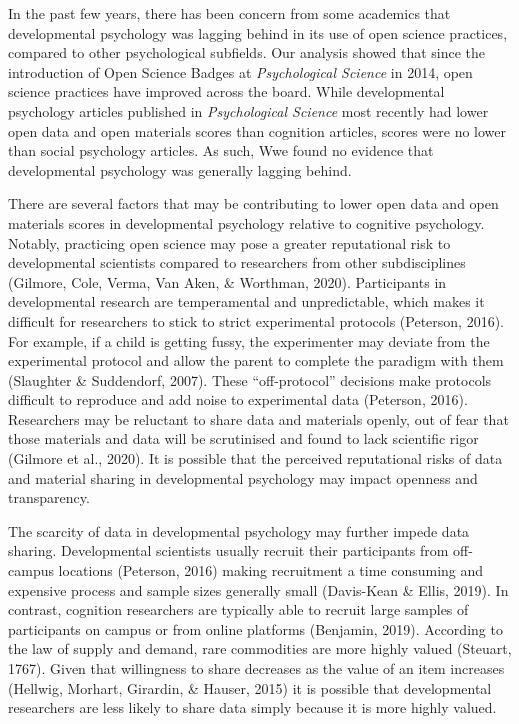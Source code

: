 \documentclass[
  english,
  man,floatsintext]{apa6}
\begin{document}
In the past few years, there has been concern from some academics that developmental psychology was lagging behind in its use of open science practices, compared to other psychological subfields. Our analysis showed that since the introduction of Open Science Badges at \emph{Psychological Science} in 2014, open science practices have improved across the board. While developmental psychology articles published in \emph{Psychological Science} most recently had lower open data and open materials scores than cognition articles, scores were no lower than social psychology articles. As such, Wwe found no evidence that developmental psychology was generally lagging behind.

There are several factors that may be contributing to lower open data and open materials scores in developmental psychology relative to cognitive psychology. Notably, practicing open science may pose a greater reputational risk to developmental scientists compared to researchers from other subdisciplines (Gilmore, Cole, Verma, Van Aken, \& Worthman, 2020). Participants in developmental research are temperamental and unpredictable, which makes it difficult for researchers to stick to strict experimental protocols (Peterson, 2016). For example, if a child is getting fussy, the experimenter may deviate from the experimental protocol and allow the parent to complete the paradigm with them (Slaughter \& Suddendorf, 2007). These ``off-protocol'' decisions make protocols difficult to reproduce and add noise to experimental data (Peterson, 2016). Researchers may be reluctant to share data and materials openly, out of fear that those materials and data will be scrutinised and found to lack scientific rigor (Gilmore et al., 2020). It is possible that the perceived reputational risks of data and material sharing in developmental psychology may impact openness and transparency.

The scarcity of data in developmental psychology may further impede data sharing. Developmental scientists usually recruit their participants from off-campus locations (Peterson, 2016) making recruitment a time consuming and expensive process and sample sizes generally small (Davis-Kean \& Ellis, 2019). In contrast, cognition researchers are typically able to recruit large samples of participants on campus or from online platforms (Benjamin, 2019). According to the law of supply and demand, rare commodities are more highly valued (Steuart, 1767). Given that willingness to share decreases as the value of an item increases (Hellwig, Morhart, Girardin, \& Hauser, 2015) it is possible that developmental researchers are less likely to share data simply because it is more highly valued.
\end{document}

